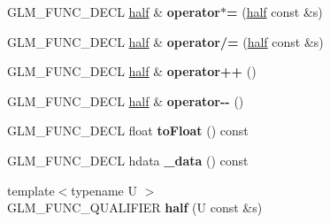 \begin{DoxyCompactItemize}
\item 
\hypertarget{classglm_1_1detail_1_1half_ad50a91d350571ad0951e33104dd9b6b4}{}G\+L\+M\+\_\+\+F\+U\+N\+C\+\_\+\+D\+E\+C\+L \hyperlink{classglm_1_1detail_1_1half}{half} \& {\bfseries operator$\ast$=} (\hyperlink{classglm_1_1detail_1_1half}{half} const \&s)\label{classglm_1_1detail_1_1half_ad50a91d350571ad0951e33104dd9b6b4}

\item 
\hypertarget{classglm_1_1detail_1_1half_a96c0c6855e855f48eea862bdc3614b17}{}G\+L\+M\+\_\+\+F\+U\+N\+C\+\_\+\+D\+E\+C\+L \hyperlink{classglm_1_1detail_1_1half}{half} \& {\bfseries operator/=} (\hyperlink{classglm_1_1detail_1_1half}{half} const \&s)\label{classglm_1_1detail_1_1half_a96c0c6855e855f48eea862bdc3614b17}

\item 
\hypertarget{classglm_1_1detail_1_1half_afa3be73cc6f70b1ba65f611881e430c1}{}G\+L\+M\+\_\+\+F\+U\+N\+C\+\_\+\+D\+E\+C\+L \hyperlink{classglm_1_1detail_1_1half}{half} \& {\bfseries operator++} ()\label{classglm_1_1detail_1_1half_afa3be73cc6f70b1ba65f611881e430c1}

\item 
\hypertarget{classglm_1_1detail_1_1half_ae9639e4a60575cd5650af08446030c77}{}G\+L\+M\+\_\+\+F\+U\+N\+C\+\_\+\+D\+E\+C\+L \hyperlink{classglm_1_1detail_1_1half}{half} \& {\bfseries operator-\/-\/} ()\label{classglm_1_1detail_1_1half_ae9639e4a60575cd5650af08446030c77}

\item 
\hypertarget{classglm_1_1detail_1_1half_a0de0a6504597d926db7709d43982162a}{}G\+L\+M\+\_\+\+F\+U\+N\+C\+\_\+\+D\+E\+C\+L float {\bfseries to\+Float} () const \label{classglm_1_1detail_1_1half_a0de0a6504597d926db7709d43982162a}

\item 
\hypertarget{classglm_1_1detail_1_1half_a40dad9839e2e18fe203fcbd7fbbccc80}{}G\+L\+M\+\_\+\+F\+U\+N\+C\+\_\+\+D\+E\+C\+L hdata {\bfseries \+\_\+data} () const \label{classglm_1_1detail_1_1half_a40dad9839e2e18fe203fcbd7fbbccc80}

\item 
\hypertarget{classglm_1_1detail_1_1half_a537bce479b8d589b3f849edac71ce5f4}{}{\footnotesize template$<$typename U $>$ }\\G\+L\+M\+\_\+\+F\+U\+N\+C\+\_\+\+Q\+U\+A\+L\+I\+F\+I\+E\+R {\bfseries half} (U const \&s)\label{classglm_1_1detail_1_1half_a537bce479b8d589b3f849edac71ce5f4}

\end{DoxyCompactItemize}
